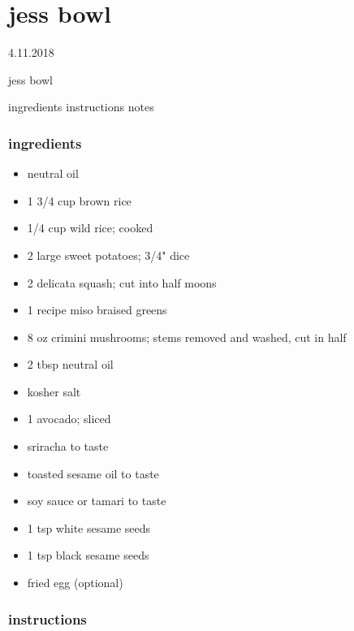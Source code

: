 \documentclass[]{book}
\providecommand{\tightlist}{%
  \setlength{\itemsep}{0pt}\setlength{\parskip}{0pt}}
\begin{document}
\hypertarget{jess-bowl}{%
\chapter{jess bowl}\label{jess-bowl}}

4.11.2018

jess bowl

ingredients \textbar{}
instructions \textbar{}
notes

\hypertarget{ingredients-28}{%
\subsection{ingredients}\label{ingredients-28}}

\begin{itemize}
\tightlist
\item
  neutral oil
\item
  1 3/4 cup brown rice
\item
  1/4 cup wild rice; cooked
\item
  2 large sweet potatoes; 3/4" dice
\item
  2 delicata squash; cut into half moons
\item
  1 recipe miso braised greens
\item
  8 oz crimini mushrooms; stems removed and washed, cut in half
\item
  2 tbsp neutral oil
\item
  kosher salt
\item
  1 avocado; sliced
\item
  sriracha to taste
\item
  toasted sesame oil to taste
\item
  soy sauce or tamari to taste
\item
  1 tsp white sesame seeds
\item
  1 tsp black sesame seeds
\item
  fried egg (optional)
\end{itemize}

\hypertarget{instructions-28}{%
\subsection{instructions}\label{instructions-28}}
\end{document}
